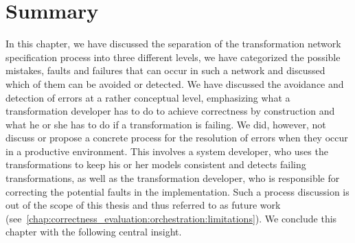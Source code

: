 \section{Summary}

In this chapter, we have discussed the separation of the transformation network specification process into three different levels, we have categorized the possible mistakes, faults and failures that can occur in such a network and discussed which of them can be avoided or detected.
We have discussed the avoidance and detection of errors at a rather conceptual level, emphasizing what a transformation developer has to do to achieve correctness by construction and what he or she has to do if a transformation is failing.
We did, however, not discuss or propose a concrete process for the resolution of errors when they occur in a productive environment.
This involves a system developer, who uses the transformations to keep his or her models consistent and detects failing transformations, as well as the transformation developer, who is responsible for correcting the potential faults in the implementation.
Such a process discussion is out of the scope of this thesis and thus referred to as future work (see~\autoref{chap:correctness_evaluation:orchestration:limitations}).
We conclude this chapter with the following central insight.



